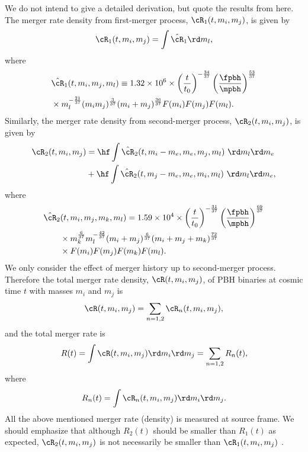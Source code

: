 \documentclass[twocolumn]{aastex631}
\def\({\left(}
\def\){\right)}
\def\e{\begin{equation}}
\def\q{\end{equation}}
\begin{document}
We do not intend to give a detailed derivation, but quote the results from \cite{Liu:2019rnx} here.
The merger rate density from first-merger process, $\cR_1(t, m_i, m_j)$, is given by \citep{Liu:2019rnx}
\e 
\cR_1(t, m_i, m_j) = \int \hat{\cR}_1 \rd m_l,
\q 
where
\e 
\begin{split}
    &\hat{\cR}_1(t, m_i, m_j, m_l)
    \equiv 1.32 \times 10^6 \times \(\frac{t}{t_0}\)^{-\frac{34}{37}}\(\frac{\fpbh}{\mpbh}\)^\frac{53}{37} \\ 
    &\times m_l^{-\frac{21}{37}} (m_i m_j)^\frac{3}{37} (m_i + m_j)^\frac{36}{37} F(m_i) F(m_j) F(m_l).     
\end{split}
\q
Similarly, the merger rate density from second-merger process, $\cR_2(t, m_i, m_j)$, is given by \citep{Liu:2019rnx}
\e 
\begin{split}
    \cR_2(t, m_i, m_j) &= \hf \int \hat{\cR}_2(t, m_i-m_e, m_e, m_j, m_l)\ \rd m_l \rd m_e\\
    &+ \hf \int \hat{\cR}_2(t, m_j-m_e, m_e, m_i, m_l)\ \rd m_l \rd m_e,
\end{split}
\q 
where
\e 
\begin{split}
    &\hat{\cR}_2(t, m_i, m_j,m_k, m_l)
    =1.59 \times 10^4 \times \(\frac{t}{t_0}\)^{-\frac{31}{37}} \(\frac{\fpbh}{\mpbh}\)^\frac{69}{37}\\ 
    &\qquad\times m_k^{\frac{6}{37}} m_l^{-\frac{42}{37}} (m_i+ m_j)^\frac{6}{37} (m_i + m_j + m_k)^\frac{72}{37}\\
    &\qquad\times F(m_i) F(m_j) F(m_k) F(m_l).     
\end{split}
\q
We only consider the effect of merger history up to second-merger process.
Therefore the total merger rate density, $\cR(t, m_i, m_j)$, of PBH binaries at cosmic time $t$ with masses $m_i$ and $m_j$ is
\e\label{cR}
    \cR(t, m_i, m_j) =  \sum_{n=1,2} \cR_n(t, m_i, m_j),
\q 
and the total merger rate is
\e\label{Rt}
    R(t) = \int \cR(t, m_i, m_j) \rd m_i \rd m_j = \sum_{n=1,2} R_n(t),
\q 
where
\e 
 R_n(t) = \int \cR_n(t, m_i, m_j) \rd m_i \rd m_j.
\q 
All the above mentioned merger rate (density) is measured at source frame.
We should emphasize that although $R_2(t)$ should be smaller than $R_1(t)$ as expected, $\cR_2(t, m_i, m_j)$ is not necessarily be smaller than $\cR_1(t, m_i, m_j)$ \citep{Liu:2019rnx}. 

\end{document}
